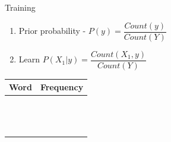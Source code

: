 \begin{frame}[shrink]{Training}
\begin{multicols}{2}
\begin{enumerate}
	\item Prior probability -
	$P(y) = \dfrac{Count(y)}{Count(Y)}$
	\item Learn $P(X_1|y) = \dfrac{Count(X_1,y)}{Count(Y)}$
\end{enumerate}
\begin{table}
	\begin{tabular}{|p{3cm}|p{3cm}|}
		\hline
		Word&Frequency\\
		\hline
		&\\
		&\\
		&\\
		&\\
		&\\
		&\\
		&\\
		&\\
		&\\
		&\\
		&\\
		&\\
		&\\
		\hline
	\end{tabular}
\end{table}
\end{multicols}

\end{frame}
